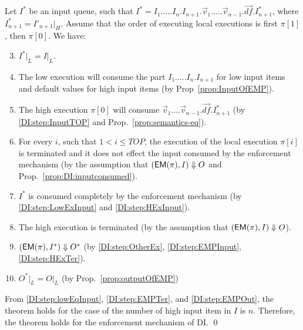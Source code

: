 \documentclass[10pt,a4paper,oneside]{article}
\def\execution#1#2#3{\ensuremath{(#1, #2)\Downarrow#3}}
\def\loweq#1#2{\ensuremath{\restrict{#1}{L} = \restrict{#2}{L}}}
\def\restrict#1#2{\ensuremath{{#1}|_{#2}}}
\def\TOP{\ensuremath{TOP}}
\def\sanserif#1{\ensuremath{\sf #1}}
\def\defvec{\ensuremath{\vec{df}}}
\def\EM{\ensuremath{{\sanserif{EM}}}}
\def\Prog{\ensuremath{\pi}}
\def\Progl#1{\ensuremath{\Prog[#1]}}
\def\EMP{\ensuremath{\EM(}\ensuremath{\Prog)}}
\begin{document}
Let $I^*$ be an input queue, such that $I^* = I_1.\dots.I_n.I_{n+1}.\vec{v}_1.\dots.\vec{v}_{n-1}.\defvec.I^*_{n+1}$, where $I^*_{n+1} = I'_{n+1}|_H$. Assume that the order of executing local executions is first \Progl{1}, then \Progl{0}. We have:
\begin{enumerate}
\setcounter{enumi}{2}
\item \loweq{I^*}{I}. \label{DI:step:lowEqInput}

\item The low execution will consume the part $I_1.\dots.I_n.I_{n+1}$ for low input items and default values for high input items (by Prop~\ref{prop:InputOfEMP}). \label{DI:step:LowExInput}

\item \label{DI:step:HExInput} The high execution \Progl{0} will consume $\vec{v}_1.\dots\vec{v}_{n-1}.\defvec.I^*_{n+1}$ (by \ref{DI:step:InputTOP} and Prop.~\ref{prop:semantics-eq}).

\item For every $i$, such that  $1 < i \leq \TOP$, the execution of the local execution \Progl{i} is terminated and it does not effect the input consumed by the enforcement mechanism (by the assumption that \execution{\EMP}{I}{O} and Prop.~\ref{prop:DI:inputconsumed}). \label{DI:step:OtherEx}

\item $I^*$ is consumed completely by the enforcement mechanism (by \ref{DI:step:LowExInput} and \ref{DI:step:HExInput}). \label{DI:step:EMPInput}


\item The high execution is terminated (by the assumption that \execution{\EMP}{I}{O}). \label{DI:step:HExTer}


\item \execution{\EMP}{I^*}{O^*} (by \ref{DI:step:OtherEx}, \ref{DI:step:EMPInput}, \ref{DI:step:HExTer}). \label{DI:step:EMPTer}

\item \loweq{O^*}{O} (by Prop.~\ref{prop:outputOfEMP}) \label{DI:step:EMPOut}
\end{enumerate}

From \ref{DI:step:lowEqInput}, \ref{DI:step:EMPTer}, and \ref{DI:step:EMPOut}, the theorem holds for the case of the number of high input item in $I$ is $n$. Therefore, the theorem holds for the enforcement mechanism of DI. \qed
\end{document}
